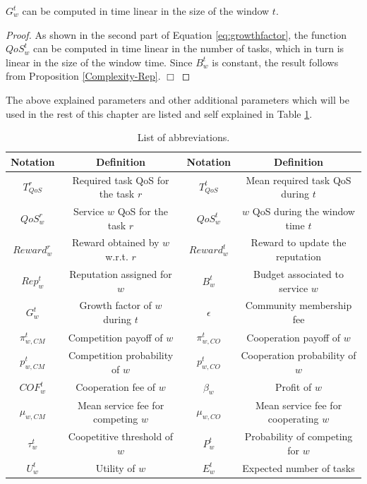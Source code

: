 \begin{proposition}\label{Complexity-Growth_Factor}
$G_w^t$ can be computed in time linear in the size of the window
$t$.
\end{proposition}

\begin{proof}
As shown in the second part of Equation \ref{eq:growthfactor}, the
function $QoS_w^t$ can be computed in time linear in the number of
tasks, which in turn is linear in the size of the window time.
Since $B_w^t$ is constant, the result follows from Proposition
\ref{Complexity-Rep}. $\Box$
\end{proof}


The above explained parameters and other additional parameters
which will be used in the rest of this chapter are listed and self
explained in Table \ref{t4:Preliminaries}.


\begin{table}
\centering
\caption{List of abbreviations.}
\begin{tabular}{|c|c||c|c|}
\hline
\textbf{Notation} & \textbf{Definition} & \textbf{Notation} & \textbf{Definition}\\
\hline\hline
$T_{QoS}^r$    & Required task QoS for the task $r$   & $T_{QoS}^t$      & Mean required task QoS during $t$\\
$QoS_w^r$      & Service $w$ QoS for the task $r$ & $QoS_w^t$        & $w$ QoS during the window time $t$\\
$Reward_w^r$   & Reward obtained by $w$ w.r.t. $r$    & $Reward_w^t$ & Reward to update the reputation\\
$Rep^t_w$      & Reputation assigned for $w$          & $B_w^t$          & Budget associated to service $w$ \\
$G^t_w$        & Growth factor of $w$ during $t$      & $\epsilon$       & Community membership fee\\
$\pi_{w,CM}^t$ & Competition payoff of $w$            & $\pi_{w,CO}^t$   & Cooperation payoff of $w$\\
$p_{w,CM}^t$   & Competition probability of $w$       & $p_{w,CO}^t$     & Cooperation probability of $w$\\
$COF_w^t$      & Cooperation fee of $w$               & $\beta_{w}$      & Profit of $w$\\
$\mu_{w, CM}$  & Mean service fee for competing $w$   & $\mu_{w, CO}$    & Mean service fee for cooperating $w$\\
$\tau_w^t$     & Coopetitive threshold of $w$         & $P_w^t$          & Probability of competing for $w$\\
$U_w^t$        & Utility of $w$                       & $E^t_w$          & Expected number of tasks\\

\hline
\end{tabular}
\label{t4:Preliminaries}
\end{table}


